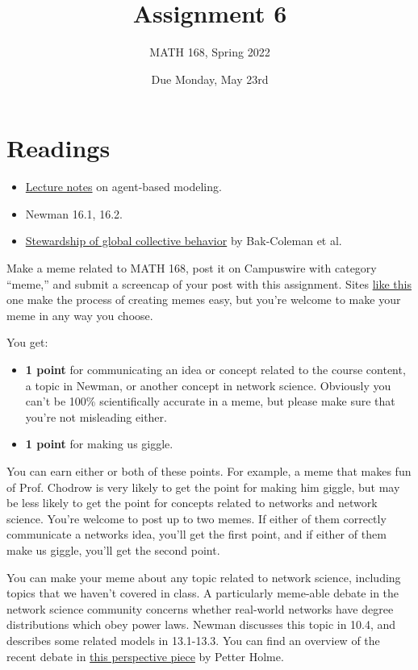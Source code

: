 \documentclass{hw}
\title{Assignment 6}
\author{MATH 168, Spring 2022}
\date{Due Monday, May 23rd}
\begin{document}
\section*{Readings}

\begin{itemize}
    \item \href{http://www.philchodrow.com/intro-networks/chapters/agent_based_modeling.html}{Lecture notes} on agent-based modeling.
    \item Newman 16.1, 16.2. 
    \item \href{https://www.pnas.org/doi/full/10.1073/pnas.2025764118}{Stewardship of global collective behavior} by Bak-Coleman et al. 
\end{itemize}




Make a meme related to MATH 168, post it on Campuswire with category ``meme,'' and submit a screencap of your post with this assignment. 
Sites \href{https://imgflip.com/memegenerator}{like this} one make the process of creating memes easy, but you're welcome to make your meme in any way you choose. 

You get: 
\begin{itemize}
    \item \textbf{1 point} for communicating an idea or concept related to the course content, a topic in Newman, or another concept in network science. 
    Obviously you can't be 100\% scientifically accurate in a meme, but please make sure that you're not misleading either. 
    \item \textbf{1 point} for making us giggle. 
\end{itemize}
You can earn either or both of these points. 
For example, a meme that makes fun of Prof. Chodrow is very likely to get the point for making him giggle, but may be less likely to get the point for concepts related to networks and network science. 
You're welcome to post up to two memes. 
If either of them correctly communicate a networks idea, you'll get the first point, and if either of them make us giggle, you'll get the second point. 

You can make your meme about any topic related to network science, including topics that we haven't covered in class. 
A particularly meme-able debate in the network science community concerns whether real-world networks have degree distributions which obey power laws. 
Newman discusses this topic in 10.4, and describes some related models in 13.1-13.3. 
You can find an overview of the recent debate in \href{https://www.nature.com/articles/s41467-019-09038-8}{this perspective piece} by Petter Holme. 
\end{document}
